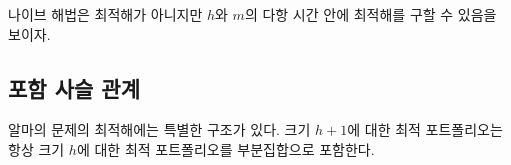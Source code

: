 \documentclass[11pt]{article} %
\newif\ifen
\newtheorem{lemma}{Lemma}
\theoremstyle{definition}
\newtheorem{lemma}{기본정리}
\theoremstyle{definition}
\begin{document}
\ifen
Although the na\"ive algorithm is inoptimal, we can still find the optimal solution in time polynomial in $h$ and $m$, as we will now show.
\else
나이브 해법은 최적해가 아니지만 $h$와 $m$의 다항 시간 안에 최적해를 구할 수 있음을 보이자.
\fi

\ifen \subsection{The nestedness property}  \else \subsection{포함 사슬 관계} \fi
\ifen It turns out that the solution to Alma's problem possesses a special structure: An optimal portfolio of size $h+1$ includes an optimal portfolio of size $h$ as a subset.
\else 알마의 문제의 최적해에는 특별한 구조가 있다. 크기 $h+1$에 대한 최적 포트폴리오는 항상 크기 $h$에 대한 최적 포트폴리오를 부분집합으로 포함한다.\fi

%
\end{document}
